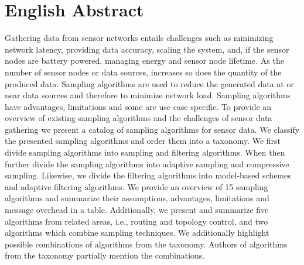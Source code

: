 
\section*{English Abstract}
\begin{onehalfspace}
    Gathering data from sensor networks entails challenges such as minimizing
    network latency, providing data accuracy, scaling the system, and, if the
    sensor nodes are battery powered, managing energy and sensor node lifetime.
    As the number of sensor nodes or data sources, increases so does the
    quantity of the produced data. Sampling algorithms are used to reduce the
    generated data at or near data sources and therefore to minimize network
    load. Sampling algorithms have advantages, limitations and some are use
    case specific. To provide an overview of existing sampling algorithms and
    the challenges of sensor data gathering we present a catalog of sampling
    algorithms for sensor data. We classify the presented sampling algorithms
    and order them into a taxonomy. We first divide sampling algorithms into
    sampling and filtering algorithms. When then further divide the sampling
    algorithms into adaptive sampling and compressive sampling. Likewise, we
    divide the filtering algorithms into model-based schemes and adaptive
    filtering algorithms. We provide an overview of 15 sampling algorithms and
    summarize their assumptions, advantages, limitations and message overhead
    in a table. Additionally, we present and summarize five algorithms from
    related areas, i.e., routing and topology control, and two algorithms which
    combine sampling techniques. We additionally highlight possible
    combinations of algorithms from the taxonomy. Authors of algorithms from
    the taxonomy partially mention the combinations.
\end{onehalfspace}
\clearpage

